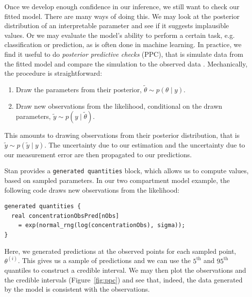 Once we develop enough confidence in our inference, we still want to check our fitted model.
There are many ways of doing this.
We may look at the posterior distribution of an interpretable parameter and see if it suggests implausible values.
Or we may evaluate the model's ability to perform a certain task, e.g. classification or prediction, as is often done in machine learning.
In practice, we find it useful to do \textit{posterior predictive
  checks} (PPC), that is simulate data from the fitted model and compare the simulation to the observed data \cite[chapter 6]{Gelman:2013}.
%
Mechanically, the procedure is straightforward:
\begin{enumerate}
  \item Draw the parameters from their posterior, $\tilde \theta \sim p(\theta \mid y).$
  \item Draw new observations from the likelihood, conditional on the drawn parameters, $\tilde y \sim p(y \mid \tilde \theta)$.
\end{enumerate}
This amounts to drawing observations from their posterior distribution, that is $\tilde y \sim p(\tilde y \mid y)$.
The uncertainty due to our estimation and the uncertainty due to our measurement error are then propagated to our predictions.

Stan provides a \texttt{generated quantities} block, which allows us to compute values, based on sampled parameters.
In our two compartment model example, the following code draws new observations from the likelihood:
\begin{lstlisting}
generated quantities {
  real concentrationObsPred[nObs] 
    = exp(normal_rng(log(concentrationObs), sigma));
}
\end{lstlisting}
%
Here, we generated predictions at the observed points for each sampled point, $\theta^{(i)}$.
This gives us a sample of predictions and we can use the $5^\mathrm{th}$ and $95^\mathrm{th}$ quantiles to construct a credible interval.
We may then plot the observations and the credible intervals (Figure~\ref{fig:ppc}) and see that, indeed, the data generated by the model is consistent with the observations.
 
